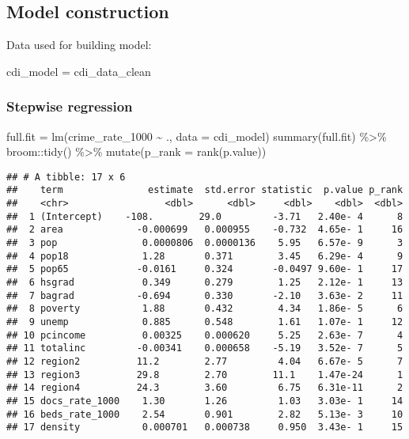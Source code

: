 \documentclass[
  11pt,
]{article}
\newenvironment{Shaded}{\begin{snugshade}}{\end{snugshade}}
\newcommand{\AttributeTok}[1]{\textcolor[rgb]{0.77,0.63,0.00}{#1}}
\newcommand{\FunctionTok}[1]{\textcolor[rgb]{0.00,0.00,0.00}{#1}}
\newcommand{\NormalTok}[1]{#1}
\newcommand{\OtherTok}[1]{\textcolor[rgb]{0.56,0.35,0.01}{#1}}
\newcommand{\SpecialCharTok}[1]{\textcolor[rgb]{0.00,0.00,0.00}{#1}}
\begin{document}
\hypertarget{model-construction}{%
\subsection{Model construction}\label{model-construction}}

Data used for building model:

\begin{Shaded}
\begin{Highlighting}[]
\NormalTok{cdi\_model }\OtherTok{=}\NormalTok{ cdi\_data\_clean}
\end{Highlighting}
\end{Shaded}

\hypertarget{stepwise-regression}{%
\subsubsection{Stepwise regression}\label{stepwise-regression}}

\begin{Shaded}
\begin{Highlighting}[]
\NormalTok{full.fit }\OtherTok{=} \FunctionTok{lm}\NormalTok{(crime\_rate\_1000 }\SpecialCharTok{\textasciitilde{}}\NormalTok{ ., }\AttributeTok{data =}\NormalTok{ cdi\_model)}
\FunctionTok{summary}\NormalTok{(full.fit) }\SpecialCharTok{\%\textgreater{}\%} 
\NormalTok{  broom}\SpecialCharTok{::}\FunctionTok{tidy}\NormalTok{() }\SpecialCharTok{\%\textgreater{}\%}
  \FunctionTok{mutate}\NormalTok{(}\AttributeTok{p\_rank =} \FunctionTok{rank}\NormalTok{(p.value))}
\end{Highlighting}
\end{Shaded}

\begin{verbatim}
## # A tibble: 17 x 6
##    term               estimate  std.error statistic  p.value p_rank
##    <chr>                 <dbl>      <dbl>     <dbl>    <dbl>  <dbl>
##  1 (Intercept)    -108.        29.0         -3.71   2.40e- 4      8
##  2 area             -0.000699   0.000955    -0.732  4.65e- 1     16
##  3 pop               0.0000806  0.0000136    5.95   6.57e- 9      3
##  4 pop18             1.28       0.371        3.45   6.29e- 4      9
##  5 pop65            -0.0161     0.324       -0.0497 9.60e- 1     17
##  6 hsgrad            0.349      0.279        1.25   2.12e- 1     13
##  7 bagrad           -0.694      0.330       -2.10   3.63e- 2     11
##  8 poverty           1.88       0.432        4.34   1.86e- 5      6
##  9 unemp             0.885      0.548        1.61   1.07e- 1     12
## 10 pcincome          0.00325    0.000620     5.25   2.63e- 7      4
## 11 totalinc         -0.00341    0.000658    -5.19   3.52e- 7      5
## 12 region2          11.2        2.77         4.04   6.67e- 5      7
## 13 region3          29.8        2.70        11.1    1.47e-24      1
## 14 region4          24.3        3.60         6.75   6.31e-11      2
## 15 docs_rate_1000    1.30       1.26         1.03   3.03e- 1     14
## 16 beds_rate_1000    2.54       0.901        2.82   5.13e- 3     10
## 17 density           0.000701   0.000738     0.950  3.43e- 1     15
\end{verbatim}
\end{document}
